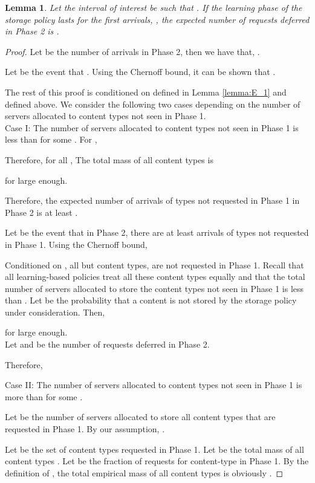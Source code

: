 \documentclass[10pt, conference, letterpaper]{IEEEtran}
\newtheorem{lemma}{Lemma}
\begin{document}
\begin{lemma}
	\label{lemma:phase2_drops}
	Let the interval of interest be  such that . If the learning phase of the storage policy lasts for the first  arrivals, , the expected number of requests deferred in Phase 2 is .
\end{lemma}
\begin{proof}
	Let  be the number of arrivals in Phase 2, then we have that,
	.
	
	Let  be the event that . Using the Chernoff bound, it can be shown that .
	
	The rest of this proof is conditioned on  defined in Lemma \ref{lemma:E_1} and  defined above. We consider the following two cases depending on the number of servers allocated to content types not seen in Phase 1.\\
	
	\noindent Case I: The number of servers allocated to content types not seen in Phase 1 is less than  for some . For ,
	
	
	Therefore, for all , 
	The total mass of all content types  is
	
	for  large enough.
	
	Therefore, the expected number of arrivals of types not requested in Phase 1 in Phase 2 is at least .
	
	Let  be the event that in Phase 2, there are at least  arrivals of types not requested in Phase 1. Using the Chernoff bound,
	
	
	Conditioned on , all but  content types, are not requested in Phase 1. Recall that all learning-based policies treat all these content types equally and that the total number of servers allocated to store the content types not seen in Phase 1 is less than . Let  be the probability that a content is not stored by the storage policy under consideration. Then,
	
	for  large enough. \\
	
	Let  and  be the number of requests deferred in Phase 2.
	
	Therefore,
	
	
	\noindent Case II: The number of servers allocated to content types not seen in Phase 1 is more than  for some .
	
	Let  be the number of servers allocated to store all content types that are requested in Phase 1. By our assumption, .
	
	Let  be the set of content types requested in Phase 1. Let  be the total mass of all content types . Let  be the fraction of requests for content-type  in Phase 1. By the definition of , the total empirical mass of all content types  is obviously .
	

\end{proof}
\end{document}
